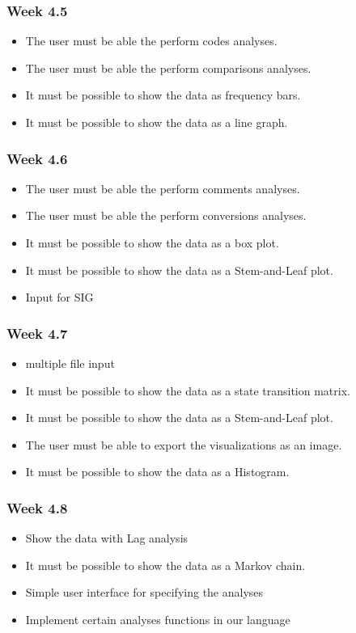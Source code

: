 \subsubsection{Week 4.5}
\begin{itemize}
	\item The user must be able the perform codes analyses.
	\item The user must be able the perform comparisons analyses.
	\item It must be possible to show the data as frequency bars.
	\item It must be possible to show the data as a line graph.
\end{itemize}
\subsubsection{Week 4.6}
\begin{itemize}
	\item The user must be able the perform comments analyses.
	\item The user must be able the perform conversions analyses.
	\item It must be possible to show the data as a box plot.
	\item It must be possible to show the data as a Stem-and-Leaf plot.
	\item Input for SIG
\end{itemize}
\subsubsection{Week 4.7}
\begin{itemize}
	\item multiple file input
	\item It must be possible to show the data as a state transition matrix.
	\item It must be possible to show the data as a Stem-and-Leaf plot.
	\item The user must be able to export the visualizations as an image.
	\item It must be possible to show the data as a Histogram.
\end{itemize}
\subsubsection{Week 4.8}
\begin{itemize}
	\item Show the data with Lag analysis
	\item It must be possible to show the data as a Markov chain.
	\item Simple user interface for specifying the analyses
	\item Implement certain analyses functions in our language
\end{itemize}
